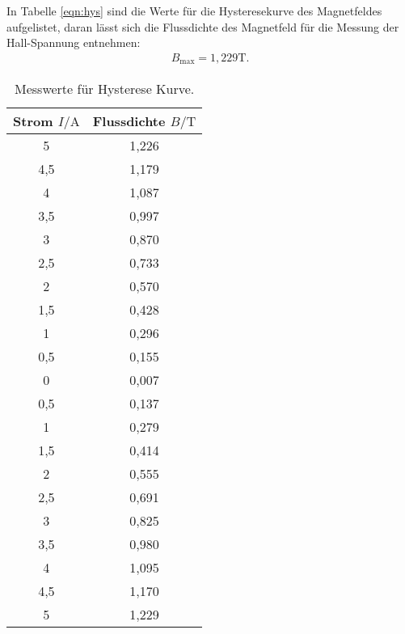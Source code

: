 In Tabelle \ref{eqn:hys} sind die Werte für die Hysteresekurve des Magnetfeldes aufgelistet, daran lässt sich die Flussdichte des Magnetfeld
für die Messung der Hall-Spannung entnehmen:
\begin{align*}
 B_\mathrm{max}=1,229\si{\tesla}.
\end{align*}
\begin{table}
  \centering
  \caption{Messwerte für Hysterese Kurve.}
  \label{tab:hys}
  \begin{tabular}{c c}
    \toprule
    Strom $I/\si{\ampere}$ & Flussdichte $B/\si{\tesla}$\\
    \midrule
    5     &  1,226 \\
    4,5   &  1,179 \\
    4     &  1,087 \\
    3,5   &  0,997 \\
    3     &  0,870 \\
    2,5   &  0,733 \\
    2     &  0,570 \\
    1,5   &  0,428 \\
    1     &  0,296 \\
    0,5   &  0,155 \\
    0     &  0,007 \\
    0,5   &  0,137 \\
    1     &  0,279 \\
    1,5   &  0,414 \\
    2     &  0,555 \\
    2,5   &  0,691 \\
    3     &  0,825 \\
    3,5   &  0,980 \\
    4     &  1,095 \\
    4,5   &  1,170 \\
    5     &  1,229 \\
    \bottomrule
  \end{tabular}
\end{table}
